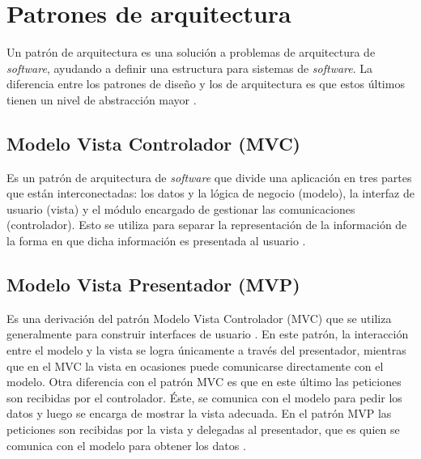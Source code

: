 \section{Patrones de arquitectura} \label{sect:Patrones de arquitectura}
Un patrón de arquitectura es una solución a problemas de arquitectura de \textit{software}, ayudando a definir una estructura para sistemas de \textit{software}. La diferencia entre los patrones de diseño y los de arquitectura es que estos últimos tienen un nivel de abstracción mayor \cite{ACS0}. 

\subsection{Modelo Vista Controlador (MVC)}

Es un patrón de arquitectura de \textit{software} que divide una aplicación  en tres partes que están interconectadas: los datos y la lógica de negocio (modelo), la interfaz de usuario (vista) y el módulo encargado de gestionar las comunicaciones (controlador). Esto se utiliza para separar la representación de la información de la forma en que dicha información es presentada al usuario \cite{MVC0}.

\subsection{Modelo Vista Presentador (MVP)}

Es una derivación del patrón Modelo Vista Controlador (MVC) que se utiliza generalmente para construir interfaces de usuario \cite{MVP0}. En este patrón, la interacción entre el modelo y la vista se logra únicamente a través del presentador, mientras que en el MVC la vista en ocasiones puede comunicarse directamente con el modelo. Otra diferencia con el patrón MVC es que en este último las peticiones son recibidas por el controlador. Éste, se comunica con el modelo para pedir los datos y luego se encarga de mostrar la vista adecuada. En el patrón MVP las peticiones son recibidas por la vista y delegadas al presentador, que es quien se comunica con el modelo para obtener los datos \cite{MVP1}.
